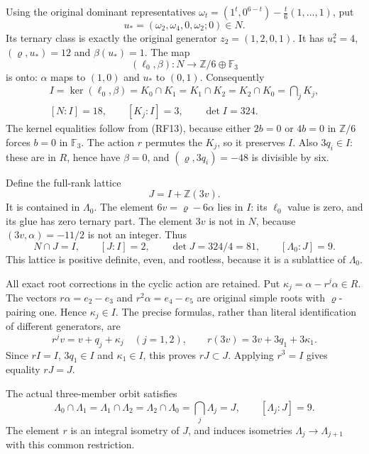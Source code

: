 Using the original dominant representatives
$\omega_t=(1^t,0^{6-t})-\frac t6(1,\ldots,1)$, put
\[
 u_*=(\omega_2,\omega_4,0,\omega_2;0)\in N.
 \tag{RF14}
\]
Its ternary class is exactly the original generator
$z_2=(1,2,0,1)$.
It has $u_*^2=4$, $(\varrho,u_*)=12$ and $\beta(u_*)=1$.
The map
\[
 (\ell_0,\beta):N\longrightarrow\mathbb Z/6\oplus\mathbb F_3
 \tag{RF15}
\]
is onto: $\alpha$ maps to $(1,0)$ and $u_*$ to $(0,1)$.
Consequently
\[
 \begin{gathered}
 I=\ker(\ell_0,\beta)=K_0\cap K_1=K_1\cap K_2
     =K_2\cap K_0=\bigcap_jK_j,\\
 [N:I]=18,\qquad[K_j:I]=3,\qquad\det I=324.
 \end{gathered}
 \tag{RF16}
\]
The kernel equalities follow from (RF13), because either
$2b=0$ or $4b=0$ in $\mathbb Z/6$ forces $b=0$ in
$\mathbb F_3$.
The action $r$ permutes the $K_j$, so it preserves $I$.
Also $3q_i\in I$: these are in $R$, hence have $\beta=0$,
and $(\varrho,3q_i)=-48$ is divisible by six.

Define the full-rank lattice
\[
 J=I+\mathbb Z(3v).
 \tag{RF17}
\]
It is contained in $\Lambda_0$.
The element $6v=\varrho-6\alpha$ lies in $I$: its
$\ell_0$ value is zero, and its glue has zero ternary part.
The element $3v$ is not in $N$, because
$(3v,\alpha)=-11/2$ is not an integer.
Thus
\[
 N\cap J=I,\qquad[J:I]=2,\qquad
                    \det J=324/4=81,\qquad[\Lambda_0:J]=9.
 \tag{RF18}
\]
This lattice is positive definite, even, and rootless, because
it is a sublattice of $\Lambda_0$.

All exact root corrections in the cyclic action are retained.
Put $\kappa_j=\alpha-r^j\alpha\in R$.
The vectors $r\alpha=e_2-e_3$ and $r^2\alpha=e_4-e_5$
are original simple roots with $\varrho$-pairing one.
Hence $\kappa_j\in I$.
The precise formulas, rather than literal identification of
different generators, are
\[
 r^jv=v+q_j+\kappa_j\quad(j=1,2),\qquad
 r(3v)=3v+3q_1+3\kappa_1.
 \tag{RF19}
\]
Since $rI=I$, $3q_1\in I$ and $\kappa_1\in I$, this proves
$rJ\subset J$. Applying $r^3=I$ gives equality $rJ=J$.

\begin{theorem}
\label{esrf:thm:common-J}
The actual three-member orbit satisfies
\[
 \Lambda_0\cap\Lambda_1
 =\Lambda_1\cap\Lambda_2
 =\Lambda_2\cap\Lambda_0
 =\bigcap_j\Lambda_j=J,\qquad[\Lambda_j:J]=9.
 \tag{RF20}
\]
The element $r$ is an integral isometry of $J$, and induces
isometries $\Lambda_j\to\Lambda_{j+1}$ with this common restriction.
\end{theorem}

